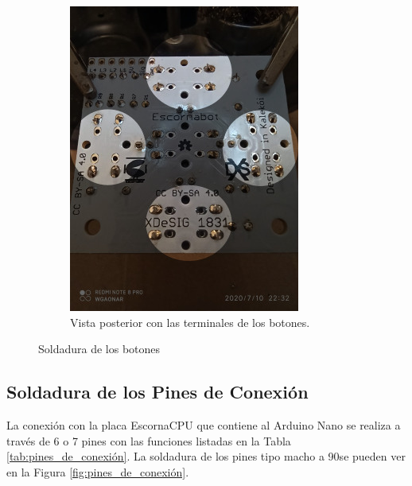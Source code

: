 \documentclass{article}
\begin{document}
\begin{figure}[H]
\begin{subfigure}[t]{0.3\textwidth}
        \includegraphics[width=0.9\columnwidth, height=1.2\columnwidth]{images/Botonera/botones2.jpg}
        \caption{Vista posterior con las terminales de los botones.}
        \label{fig:botones_posterior}
    \end{subfigure}
    \caption{Soldadura de los botones}
    \label{fig:botones_soldadura}
\end{figure}

\subsection{Soldadura de los Pines de Conexión}
La conexión con la placa EscornaCPU que contiene al Arduino Nano se realiza a través de 6 o 7 pines con las funciones listadas en la Tabla \ref{tab:pines_de_conexión}. La soldadura de los pines tipo macho a 90\degree se pueden ver en la Figura \ref{fig:pines_de_conexión}.
\end{document}
